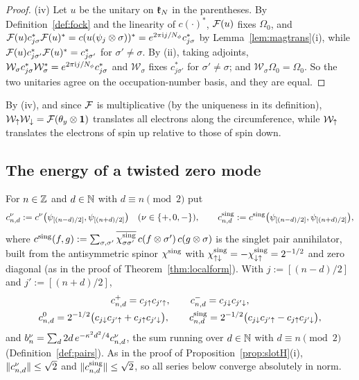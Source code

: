 \begin{proof}
(iv) Let $u$ be the unitary on $\mathfrak{k}_N$ in the parentheses. By Definition~\ref{def:fock} and the linearity of $c(\cdot)^*$,
$\mathcal{F}(u)$ fixes $\Omega_0$, and $\mathcal{F}(u)c^*_{j\sigma}\mathcal{F}(u)^*=c(u(\psi_j\otimes\sigma))^*=e^{2\pi\mathrm{i} j/N_{\phi}}c^*_{j\sigma}$ by
Lemma~\ref{lem:magtrans}(i), while $\mathcal{F}(u)c^*_{j\sigma'}\mathcal{F}(u)^*=c^*_{j\sigma'}$ for $\sigma'\ne\sigma$. By (ii), taking
adjoints, $\mathcal W_\sigma c^*_{j\sigma}\mathcal W_\sigma^*=e^{2\pi\mathrm{i} j/N_{\phi}}c^*_{j\sigma}$ and $\mathcal W_\sigma$ fixes
$c^*_{j\sigma'}$ for $\sigma'\ne\sigma$; and $\mathcal W_\sigma\Omega_0=\Omega_0$. So the two unitaries agree on the
occupation-number basis, and they are equal.
\end{proof}

By (iv), and since $\mathcal{F}$ is multiplicative (by the uniqueness in its definition), $\mathcal W_{\uparrow}\mathcal W_{\downarrow}=\mathcal{F}(\theta_y\otimes\mathbf{1})$ translates all electrons along the
circumference, while $\mathcal W_{\uparrow}$ translates the electrons of spin up relative to those of spin down.

\subsection{The energy of a twisted zero mode}

For $n\in\mathbb{Z}$ and $d\in\mathbb{N}$ with $d\equiv n\pmod2$ put
\[
c^\nu_{n,d}:=c^{\nu}\bigl(\psi_{[(n-d)/2]},\psi_{[(n+d)/2]}\bigr)\quad(\nu\in\{+,0,-\}),\qquad
c^{\rm sing}_{n,d}:=c^{\rm sing}\bigl(\psi_{[(n-d)/2]},\psi_{[(n+d)/2]}\bigr),
\]
where $c^{\rm sing}(f,g):=\sum_{\sigma,\sigma'}\overline{\chi^{\rm sing}_{\sigma\sigma'}}\,c(f\otimes\sigma')\,c(g\otimes\sigma)$ is
the singlet pair annihilator, built from the antisymmetric spinor $\chi^{\rm sing}$ with
$\chi^{\rm sing}_{{\uparrow}{\downarrow}}=-\chi^{\rm sing}_{{\downarrow}{\uparrow}}=2^{-1/2}$ and zero diagonal (as in the proof of Theorem~\ref{thm:localform}).
With $j:=[(n-d)/2]$ and $j':=[(n+d)/2]$,
\begin{gather*}
c^+_{n,d}=c_{j{\uparrow}}c_{j'{\uparrow}},\qquad c^-_{n,d}=c_{j{\downarrow}}c_{j'{\downarrow}},\\
c^0_{n,d}=2^{-1/2}\bigl(c_{j{\downarrow}}c_{j'{\uparrow}}+c_{j{\uparrow}}c_{j'{\downarrow}}\bigr),\qquad
c^{\rm sing}_{n,d}=2^{-1/2}\bigl(c_{j{\downarrow}}c_{j'{\uparrow}}-c_{j{\uparrow}}c_{j'{\downarrow}}\bigr),
\end{gather*}
and $b^{\nu}_{n}=\sum_{d}2d\,e^{-\kappa^2d^2/4}c^\nu_{n,d}$, the sum running over $d\in\mathbb{N}$ with $d\equiv n\pmod2$
(Definition~\ref{def:pairs}). As in the proof of Proposition~\ref{prop:slotH}(i), $\lVert c^\nu_{n,d}\rVert\le\sqrt2$ and
$\lVert c^{\rm sing}_{n,d}\rVert\le\sqrt2$, so all series below converge absolutely in norm.

